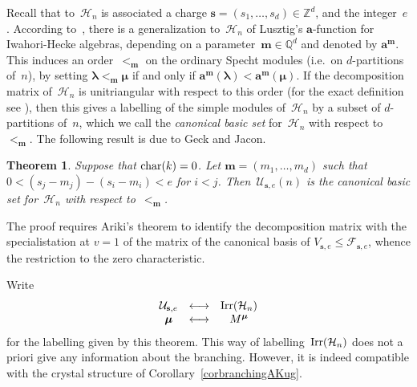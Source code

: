 \documentclass[twoside,12pt]{amsart}
\theoremstyle{plain}
\newtheorem{thm}[num]{Theorem}
\begin{document}
Recall that to~${\mathcal{H}}_n$ is associated a charge ${\mathbf{s}}=(s_1,\dots,s_d)\in{\mathbb{Z}}^d$, and 
the integer~$e$. 
According to~\cite{Jacon2004}, there is a generalization to~$\mathcal{H}_n$ of Lusztig's 
${\mathbf{a}}$-function for Iwahori-Hecke algebras, 
depending on a parameter~${\mathbf{m}}\in{\mathbb{Q}}^d$ and denoted by ${\mathbf{a}}^{\mathbf{m}}$. This induces an 
order~$<_{\mathbf{m}}$ on the ordinary Specht modules (i.e.\ on $d$-partitions of~$n$), 
by setting ${\boldsymbol{\lambda}}<_{\mathbf{m}}{\boldsymbol{\mu}}$ if and only if ${\mathbf{a}}^{\mathbf{m}}({\boldsymbol{\lambda}})<{\mathbf{a}}^{\mathbf{m}}({\boldsymbol{\mu}})$. 
If the decomposition 
matrix of~${\mathcal{H}}_n$ is unitriangular with respect to this order (for the exact
definition see \cite[Definition 5.5.19]{GeckJacon2011}), then this gives a 
labelling of the simple modules of~${\mathcal{H}}_n$ by a subset of $d$-partitions of~$n$,
which we call the \textit{canonical basic set} for~${\mathcal{H}}_n$ with respect 
to~$<_{\mathbf{m}}$. The following result is due to Geck and Jacon.

\begin{thm}\label{thmcbs}
{\rm \cite[Theorem 6.7.2]{GeckJacon2011}}
Suppose that ${\text{\rm char}}(k)=0$.
Let ${\mathbf{m}}=(m_1,\dots,m_d)$ such that $0< (s_j-m_j)-(s_i-m_i)<e$ for $i<j$.
Then~${\mathcal{U}}_{{\mathbf{s}},e}(n)$ is the canonical basic set for~${\mathcal{H}}_n$ with respect 
to~$<_{\mathbf{m}}$.
\end{thm}

The proof requires Ariki's theorem to identify the decomposition matrix
with the specialistation at $v=1$ of the matrix of the canonical basis 
of $V_{{\mathbf{s}},e} \leq {\mathcal{F}}_{{\mathbf{s}},e}$, whence the restriction to the zero 
characteristic.

Write
$$\begin{array}{ccc}
{\mathcal{U}}_{{\mathbf{s}},e} & \longleftrightarrow & {\text{\rm Irr}}({\mathcal{H}}_n) \\
{\boldsymbol{\mu}} & \longleftrightarrow & M^{\boldsymbol{\mu}}
\end{array}
$$
for the labelling given by this theorem. This way of 
labelling~${\text{\rm Irr}}({\mathcal{H}}_n)$ does not a priori give any information about the 
branching. However, it is indeed compatible with the crystal structure of 
Corollary~\ref{corbranchingAKug}.
\end{document}
